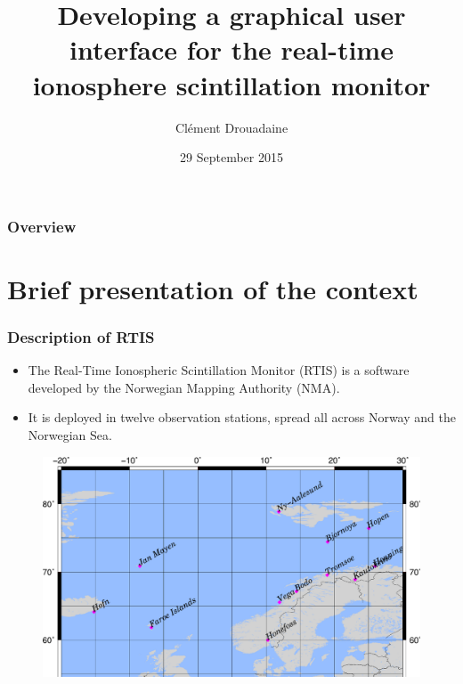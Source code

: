 \documentclass{beamer}
\title[Developing a GUI for the RTIS monitor]{Developing a graphical user interface for the real-time ionosphere scintillation monitor} %
\author{Clément Drouadaine} %
\institute[ENSG - NMA] %
{
École Nationale des Sciences Géographiques \\ %
\medskip
Norwegian Mapping Authority
}
\date{29 September 2015} %
\begin{document}
\begin{frame}
\titlepage %
\end{frame}

\begin{frame}
\frametitle{Overview} %
\tableofcontents %
\end{frame}



\section{Brief presentation of the context}
\frame{\sectionpage}

\begin{frame}
\frametitle{Description of RTIS}
\begin{itemize}
\item The Real-Time Ionospheric Scintillation Monitor (RTIS) is a software developed by the Norwegian Mapping Authority (NMA).
\item It is deployed in twelve observation stations, spread all across Norway and the Norwegian Sea. %
\end{itemize}

\begin{figure}
	\includegraphics[width=0.7\linewidth]{images/rtisMap}
\end{figure}

\end{frame}
\end{document}

